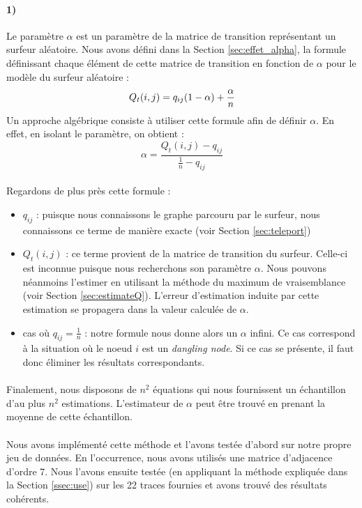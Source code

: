 \documentclass[a4paper,titlepage]{report}
\begin{document}
\paragraph{1)} Le paramètre $\alpha$ est un paramètre de la matrice de transition représentant un surfeur aléatoire. Nous avons défini dans la Section \ref{sec:effet_alpha}, la formule définissant chaque élément de cette matrice de transition en fonction de $\alpha$ pour le modèle du surfeur aléatoire : 
\[
Q_t(i,j) = q_{ij} (1 - \alpha) + \dfrac{\alpha}{n}\\
\]
Un approche algébrique consiste à utiliser cette formule afin de définir $\alpha$. En effet, en isolant le paramètre, on obtient :
\[
	\alpha = \dfrac{Q_t(i,j) - q_{ij}}{\frac{1}{n} - q_{ij}}
\]
\paragraph{}
Regardons de plus près cette formule : 
\begin{itemize}
	\item $q_{ij}$ : puisque nous connaissons le graphe parcouru par le surfeur, nous connaissons ce terme de manière exacte (voir Section \ref{sec:teleport})
	\item $Q_t(i,j)$ : ce terme provient de la matrice de transition du surfeur. Celle-ci est inconnue puisque nous recherchons son paramètre $\alpha$. Nous pouvons néanmoins l'estimer en utilisant la méthode du maximum de vraisemblance (voir Section \ref{sec:estimateQ}). L'erreur d'estimation induite par cette estimation se propagera dans la valeur calculée de $\alpha$.
	\item cas où $q_{ij} = \frac{1}{n}$ : notre formule nous donne alors un $\alpha$ infini. Ce cas correspond à la situation où le noeud $i$ est un \textit{dangling node}. Si ce cas se présente, il faut donc éliminer les résultats correspondants.
\end{itemize} 
\paragraph{}
Finalement, nous disposons de $n^2$ équations qui nous fournissent un échantillon d'au plus $n^2$ estimations. L'estimateur de $\alpha$ peut être trouvé en prenant la moyenne de cette échantillon. 
\paragraph{}
Nous avons implémenté cette méthode et l'avons testée d'abord sur notre propre jeu de données. En l'occurrence, nous avons utilisés une matrice d'adjacence d'ordre 7. Nous l'avons ensuite testée (en appliquant la méthode expliquée dans la Section \ref{ssec:use}) sur les 22 traces fournies et avons trouvé des résultats cohérents. 
\end{document}
